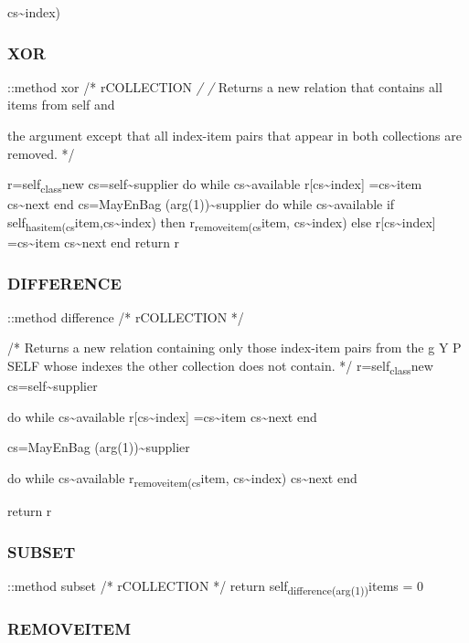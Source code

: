 cs\textasciitilde index)

\hypertarget{xor-2}{%
\subsubsection{XOR}\label{xor-2}}

::method xor /* rCOLLECTION \emph{/ /} Returns a new relation that
contains all items from self and

the argument except that all index-item pairs that appear in both
collections are removed. */

r=self\textsubscript{class}new cs=self\textasciitilde supplier do while
cs\textasciitilde available r{[}cs\textasciitilde index{]}
=cs\textasciitilde item cs\textasciitilde next end cs=MayEnBag
(arg(1))\textasciitilde supplier do while cs\textasciitilde available if
self\textsubscript{hasitem(cs}item,cs\textasciitilde index) then
r\textsubscript{removeitem(cs}item, cs\textasciitilde index) else
r{[}cs\textasciitilde index{]} =cs\textasciitilde item
cs\textasciitilde next end return r

\hypertarget{difference-2}{%
\subsubsection{DIFFERENCE}\label{difference-2}}

::method difference /* rCOLLECTION */

/* Returns a new relation containing only those index-item pairs from
the g Y P SELF whose indexes the other collection does not contain. */
r=self\textsubscript{class}new cs=self\textasciitilde supplier

do while cs\textasciitilde available r{[}cs\textasciitilde index{]}
=cs\textasciitilde item cs\textasciitilde next end

cs=MayEnBag (arg(1))\textasciitilde supplier

do while cs\textasciitilde available r\textsubscript{removeitem(cs}item,
cs\textasciitilde index) cs\textasciitilde next end

return r

\hypertarget{subset-1}{%
\subsubsection{SUBSET}\label{subset-1}}

::method subset /* rCOLLECTION */ return
self\textsubscript{difference(arg(1))}items = 0

\hypertarget{removeitem}{%
\subsubsection{REMOVEITEM}\label{removeitem}}


